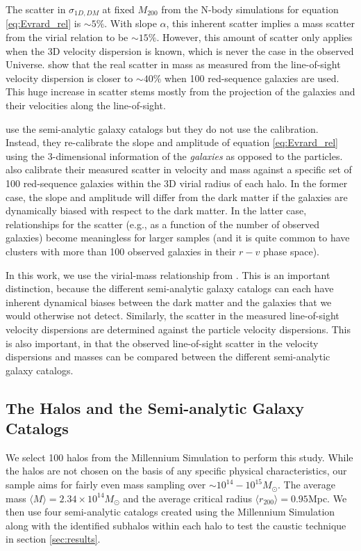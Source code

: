 \documentclass[iop]{emulateapj}
\begin{document}
The scatter in $\sigma_{1D, DM}$ at fixed $M_{200}$ from the N-body simulations for equation \ref{eq:Evrard_rel} is $\sim 5\%$. With slope $\alpha$, this inherent scatter implies a mass scatter from the virial relation to be $\sim 15\%$. However, this amount of scatter only applies when the 3D velocity dispersion is known, which is never the case in the observed Universe. \citet{Saro12} show that the real scatter in mass as measured from the line-of-sight velocity dispersion is closer to $\sim 40\%$ when 100 red-sequence galaxies are used. This huge increase in scatter stems mostly from the projection of the galaxies and their velocities along the line-of-sight.
    
\citet{Saro12} use the \citet{Delucia07} semi-analytic galaxy catalogs but they do not use the \citet{Evrard08} calibration. Instead, they re-calibrate the slope and amplitude of equation \ref{eq:Evrard_rel} using the 3-dimensional information of the {\it galaxies} as opposed to the particles. \citet{Saro12} also calibrate their measured scatter in velocity and mass against a specific set of 100 red-sequence galaxies within the 3D virial radius of each halo. In the former case, the slope and amplitude will differ from the dark matter if the galaxies are dynamically biased with respect to the dark matter. In the latter case, relationships for the scatter (e.g., as a function of the number of observed galaxies) become meaningless for larger samples (and it is quite common to have clusters with more than 100 observed galaxies in their $r-v$ phase space). 

In this work, we use the virial-mass relationship from \citet{Evrard08}. This is an important distinction, because the different semi-analytic galaxy catalogs can each have inherent dynamical biases between the dark matter and the galaxies that we would otherwise not detect. Similarly, the scatter in the measured line-of-sight velocity dispersions are determined against the particle velocity dispersions. This is also important, in that the observed line-of-sight scatter in the velocity dispersions and masses can be compared between the different semi-analytic galaxy catalogs.

    \subsection{The Halos and the Semi-analytic Galaxy Catalogs}
    \label{sec:methods_data}
    
    We select 100 halos from the Millennium Simulation to perform this study. While the halos are not chosen on the basis of any specific physical characteristics, our sample aims for fairly even mass sampling over $\sim 10^{14} - 10^{15} M_{\odot}$. The average mass $\langle M \rangle = 2.34 \times 10^{14} M_{\odot}$ and the average critical radius $\langle r_{200} \rangle = 0.95$Mpc. We then use four semi-analytic catalogs \citep{Guo11,Delucia07,Bertone07,Bower06} created using the Millennium Simulation along with the identified subhalos within each halo to test the caustic technique in section \ref{sec:results}. 
    
\end{document}
